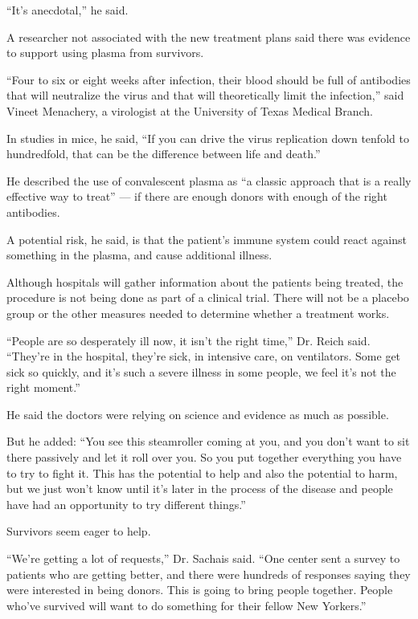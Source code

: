 ``It's anecdotal,'' he said.

A researcher not associated with the new treatment plans said there was
evidence to support using plasma from survivors.

``Four to six or eight weeks after infection, their blood should be full
of antibodies that will neutralize the virus and that will theoretically
limit the infection,'' said Vineet Menachery, a virologist at the
University of Texas Medical Branch.

In studies in mice, he said, ``If you can drive the virus replication
down tenfold to hundredfold, that can be the difference between life and
death.''

He described the use of convalescent plasma as ``a classic approach that
is a really effective way to treat'' --- if there are enough donors with
enough of the right antibodies.

A potential risk, he said, is that the patient's immune system could
react against something in the plasma, and cause additional illness.

Although hospitals will gather information about the patients being
treated, the procedure is not being done as part of a clinical trial.
There will not be a placebo group or the other measures needed to
determine whether a treatment works.

``People are so desperately ill now, it isn't the right time,'' Dr.
Reich said. ``They're in the hospital, they're sick, in intensive care,
on ventilators. Some get sick so quickly, and it's such a severe illness
in some people, we feel it's not the right moment.''

He said the doctors were relying on science and evidence as much as
possible.

But he added: ``You see this steamroller coming at you, and you don't
want to sit there passively and let it roll over you. So you put
together everything you have to try to fight it. This has the potential
to help and also the potential to harm, but we just won't know until
it's later in the process of the disease and people have had an
opportunity to try different things.''

Survivors seem eager to help.

``We're getting a lot of requests,'' Dr. Sachais said. ``One center sent
a survey to patients who are getting better, and there were hundreds of
responses saying they were interested in being donors. This is going to
bring people together. People who've survived will want to do something
for their fellow New Yorkers.''

